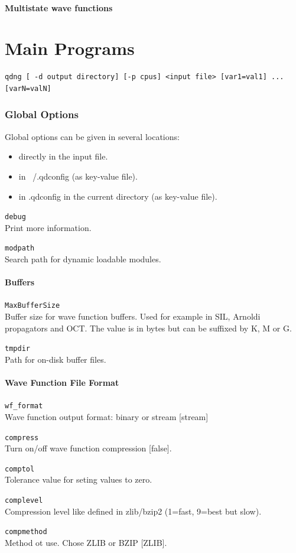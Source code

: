 \documentclass[a4paper,12pt]{scrbook}
\newcommand{\option}[2]{\item \texttt{#1}\\ #2}
\begin{document}
\subsubsection{Multistate wave functions}

\chapter{Main Programs}

\begin{verbatim}
qdng [ -d output directory] [-p cpus] <input file> [var1=val1] ... [varN=valN]
\end{verbatim}

\subsection{Global Options}
Global options can be given in several locations:
\begin{itemize}
 \item directly in the input file.
 \item in ~/.qdconfig (as key-value file).
 \item in .qdconfig in the current directory (as key-value file).
\end{itemize}

\begin{options}
 \option{debug}{Print more information.}
 \option{modpath}{Search path for dynamic loadable modules.}
\end{options}

\subsubsection{Buffers}
\begin{options}
 \option{MaxBufferSize}{Buffer size for wave function buffers. Used for example in SIL, Arnoldi propagators and OCT. The value is in bytes but
 can be suffixed by K, M or G.}
 \option{tmpdir}{Path for on-disk buffer files.}
\end{options}

\subsubsection{Wave Function File Format}
\begin{options}
 \option{wf\_format}{Wave function output format: binary or stream  [stream]}
 \option{compress}{Turn on/off wave function compression [false].}
 \option{comptol}{Tolerance value for seting values to zero.}
 \option{complevel}{Compression level like defined in zlib/bzip2 (1=fast, 9=best but slow).}
 \option{compmethod}{Method ot use. Chose ZLIB or BZIP [ZLIB].}
\end{options}
\end{document}
